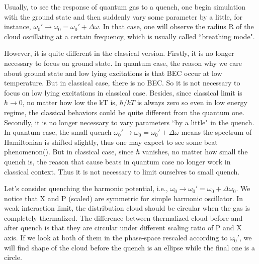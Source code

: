 \documentclass[aps,preprintnumbers,onecolumn,amsmath,amssymb,floatfix,pra]{revtex4-1}
\begin{document}
Usually, to see the response of quantum gas to a quench, one begin simulation with the ground state
and then suddenly vary some parameter by a little, for instance,
$\omega_0'\rightarrow\omega_0=\omega_0'+\Delta\omega$. In that case, one will observe the radius R
of the cloud oscillating at a certain frequency, which is usually called ``breathing mode".

However, it is quite different in the classical version. Firstly, it is no longer necessary to focus
on ground state. In quantum case, the reason why we care about ground state and low lying
excitations is that BEC occur at low temperature. But in classical case, there is no BEC. So it is
not necessary to focus on low lying excitations in classical case. Besides, since classical limit is
$\hbar\rightarrow 0$, no matter how low the kT is, $\hbar/kT$ is always zero so even in low energy
regime, the classical behaviors could be quite different from the quantum one. Secondly, it is no
longer necessary to vary parameters ``by a little" in the quench. In quantum case, the small quench
$\omega_0'\rightarrow\omega_0=\omega_0'+\Delta\omega$ means the spectrum of Hamiltonian is shifted
slightly, thus one may expect to see some beat phenomenon({\color{red}{?}}). But in classical case,
since $\hbar$ vanishes, no matter how small the quench is, the reason that cause beats in quantum
case no longer work in classical context. Thus it is not necessary to limit ourselves to small
quench.

Let's consider quenching the harmonic potential, i.e.,
$\omega_0\rightarrow\omega_0'=\omega_0+\Delta\omega_0$. We notice that X and P (scaled) are
symmetric for simple harmonic oscillator. In weak interaction limit, the distribution cloud should
be circular when the gas is completely thermalized. The difference between thermalized cloud before
and after quench is that they are circular under different scaling ratio of P and X axis. If we look
at both of them in the phase-space rescaled according to $\omega_0'$, we will find shape of the
cloud before the quench is an ellipse while the final one is a circle.
\end{document}
